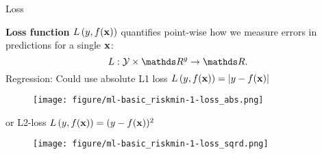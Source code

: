 \documentclass[11pt,compress,t,notes=noshow, xcolor=table]{beamer}
\begin{document}
\begin{vbframe}{Loss}
  
  \textbf{Loss function} $L\left(y, f(\mathbf{x})\right)$ quantifies point-wise how we measure errors in predictions for a single $\mathbf{x}$:
  $$
  L: \Yspace \times \R^g \to \R.
  $$
  Regression: Could use absolute L1 loss  $L\left(y, f(\mathbf{x})\right) = |y-f(\mathbf{x})|$
  
  
  
  
  \begin{figure}
    \texttt{[image: figure/ml-basic\_riskmin-1-loss\_abs.png]}
  \end{figure}
  or L2-loss $L\left(y, f(\mathbf{x})\right) = (y - f(\mathbf{x}))^2$
  \begin{figure}
    \texttt{[image: figure/ml-basic\_riskmin-1-loss\_sqrd.png]}
  \end{figure}
  
  
  
  
  
\end{vbframe}

\end{document}
